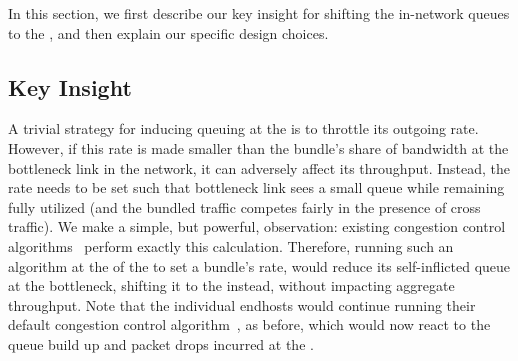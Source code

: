 
In this section, we first describe our key insight for shifting the in-network queues to the \name, and then explain our specific design choices. 

\subsection{Key Insight}


A trivial strategy for inducing queuing at the \name is to throttle its outgoing rate. However, if this rate is made smaller than the bundle's share of bandwidth at the bottleneck link in the network, it can adversely affect its throughput. Instead, the rate needs to be set such that bottleneck link sees a small queue while remaining fully utilized (and the bundled traffic competes fairly in the presence of cross traffic). We make a simple, but powerful, observation: existing congestion control algorithms~\cite{nimbus, copa} perform exactly this calculation. Therefore, running such an algorithm at the \inbox of the \name to set a bundle's rate, would reduce its self-inflicted queue at the bottleneck, shifting it to the \inbox instead, without impacting aggregate throughput. Note that the individual endhosts would continue running their default congestion control algorithm~\cite{cubic, bbr}, as before, which would now react to the queue build up and packet drops incurred at the \inbox.


